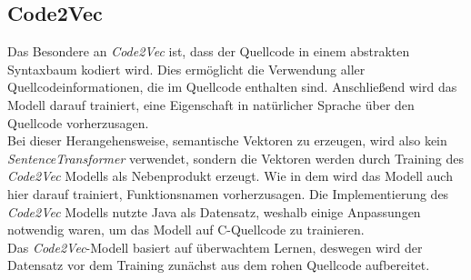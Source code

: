 \documentclass[12pt,letterpaper,ngerman]{article}
\begin{document}
\subsection{Code2Vec}
Das Besondere an \textit{Code2Vec} ist, dass der Quellcode in einem
abstrakten Syntaxbaum kodiert wird. Dies ermöglicht die Verwendung aller
Quellcodeinformationen, die im Quellcode enthalten sind. Anschließend wird
das Modell darauf trainiert, eine Eigenschaft in natürlicher Sprache
über den Quellcode vorherzusagen.\\
Bei dieser Herangehensweise, semantische Vektoren zu erzeugen, wird
also kein \textit{SentenceTransformer}
verwendet, sondern die Vektoren werden durch Training des
\textit{Code2Vec} Modells als Nebenprodukt erzeugt. Wie in dem 
\cite{code2vec} wird
das Modell auch hier darauf trainiert, Funktionsnamen 
vorherzusagen. Die Implementierung des \textit{Code2Vec} Modells
nutzte Java als Datensatz, weshalb einige Anpassungen notwendig waren,
um das Modell auf C-Quellcode zu trainieren.\\
Das \textit{Code2Vec}-Modell basiert auf überwachtem Lernen,
deswegen wird der Datensatz vor dem Training zunächst aus
dem rohen Quellcode aufbereitet.
\end{document}
